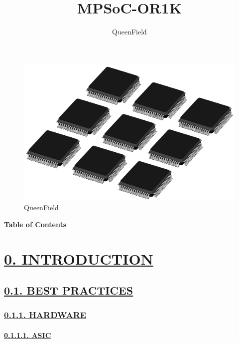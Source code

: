 \documentclass[
]{article}
\title{MPSoC-OR1K}
\author{QueenField}
\date{}
\begin{document}
\maketitle

\begin{figure}
\centering
\includegraphics{../icon.jpg}
\caption{QueenField}
\end{figure}

\textbf{Table of Contents}

\hypertarget{introduction}{%
\section{\texorpdfstring{\protect\hyperlink{introduction-1}{0.
INTRODUCTION}}{0. INTRODUCTION}}\label{introduction}}

\hypertarget{best-practices}{%
\subsection{\texorpdfstring{\protect\hyperlink{best-practices-1}{0.1.
BEST PRACTICES}}{0.1. BEST PRACTICES}}\label{best-practices}}

\hypertarget{hardware}{%
\subsubsection{\texorpdfstring{\protect\hyperlink{hardware-1}{0.1.1.
HARDWARE}}{0.1.1. HARDWARE}}\label{hardware}}

\hypertarget{asic}{%
\paragraph{\texorpdfstring{\protect\hyperlink{asic-1}{0.1.1.1.
ASIC}}{0.1.1.1. ASIC}}\label{asic}}
\end{document}
